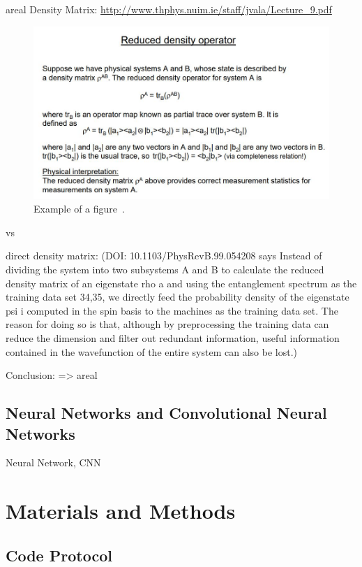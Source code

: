 \documentclass[reprint,amsmath,amssymb,aps,prb]{revtex4-2}
\begin{document}
areal Density Matrix:
\url{http://www.thphys.nuim.ie/staff/jvala/Lecture_9.pdf}

\begin{figure}[h!]
	\includegraphics[width=0.99\linewidth]{figures/reduced_density_matrix.jpg}
	\caption{Example of a figure~\cite{Orus2013}.}
	\label{fig:adm}
\end{figure}

vs

direct density matrix:
(DOI: 10.1103/PhysRevB.99.054208 says 
Instead of dividing the system into two subsystems A
and B to calculate the reduced density matrix of an eigenstate rho a and using the entanglement spectrum as the training data set 34,35, we directly feed the
probability density of the eigenstate psi i computed in the
spin basis to the machines as the training data set. The
reason for doing so is that, although by preprocessing
the training data can reduce the dimension and filter out
redundant information, useful information contained in
the wavefunction of the entire system can also be lost.)

Conclusion: => areal

\subsection{Neural Networks and Convolutional Neural Networks}

Neural Network, CNN





\section{Materials and Methods}%

\subsection{Code Protocol}
\end{document}
